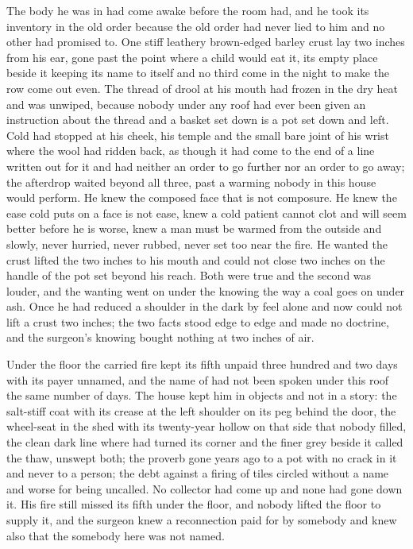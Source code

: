 The body he was in had come awake before the room had, and he took its inventory in the old order because the old order had never lied to him and no other had promised to. One stiff leathery brown-edged barley crust lay two inches from his ear, gone past the point where a child would eat it, its empty place beside it keeping its name to itself and no third come in the night to make the row come out even. The thread of drool at his mouth had frozen in the dry heat and was unwiped, because nobody under any roof had ever been given an instruction about the thread and a basket set down is a pot set down and left. Cold had stopped at his cheek, his temple and the small bare joint of his wrist where the wool had ridden back, as though it had come to the end of a line written out for it and had neither an order to go further nor an order to go away; the afterdrop waited beyond all three, past a warming nobody in this house would perform. He knew the composed face that is not composure. He knew the ease cold puts on a face is not ease, knew a cold patient cannot clot and will seem better before he is worse, knew a man must be warmed from the outside and slowly, never hurried, never rubbed, never set too near the fire. He wanted the crust lifted the two inches to his mouth and could not close two inches on the handle of the pot set beyond his reach. Both were true and the second was louder, and the wanting went on under the knowing the way a coal goes on under ash. Once he had reduced a shoulder in the dark by feel alone and now could not lift a crust two inches; the two facts stood edge to edge and made no doctrine, and the surgeon's knowing bought nothing at two inches of air.

Under the floor the carried fire kept its fifth unpaid three hundred and two days with its payer unnamed, and the name of  had not been spoken under this roof the same number of days. The house kept him in objects and not in a story: the salt-stiff coat with its crease at the left shoulder on its peg behind the door, the wheel-seat in the shed with its twenty-year hollow on that side that nobody filled, the clean dark line where  had turned its corner and the finer grey beside it called the thaw, unswept both; the proverb gone years ago to a pot with no crack in it and never to a person; the debt against a firing of tiles circled without a name and worse for being uncalled. No collector had come up  and none had gone down it. His fire still missed its fifth under the floor, and nobody lifted the floor to supply it, and the surgeon knew a reconnection paid for by somebody and knew also that the somebody here was not named.

